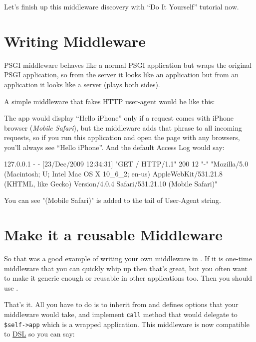 Let's finish up this middleware discovery with ``Do It Yourself''
tutorial now.

\section{Writing Middleware}\label{writing-middleware}

PSGI middleware behaves like a normal PSGI application but wraps the
original PSGI application, so from the server it looks like an
application but from an application it looks like a server (plays both
sides).

A simple middleware that fakes HTTP user-agent would be like this:


The app would display ``Hello iPhone'' only if a request comes with
iPhone browser (\emph{Mobile Safari}), but the middleware adds that
phrase to all incoming requests, so if you run this application and open
the page with any browsers, you'll always see ``Hello iPhone''. And the
default Access Log would say:

\begin{shell}
127.0.0.1 - - [23/Dec/2009 12:34:31] "GET / HTTP/1.1" 200 12 "-" "Mozilla/5.0 
(Macintosh; U; Intel Mac OS X 10_6_2; en-us) AppleWebKit/531.21.8 (KHTML, like
Gecko) Version/4.0.4 Safari/531.21.10 (Mobile Safari)"
\end{shell}

You can see "(Mobile Safari)" is added to the tail of User-Agent
string.

\section{Make it a reusable
Middleware}\label{make-it-a-reusable-middleware}

So that was a good example of writing your own middleware in
. If it is one-time middleware that you can quickly
whip up then that's great, but you often want to make it generic enough
or reusable in other applications too. Then you should use
.


That's it. All you have to do is to inherit from  and
defines options that your middleware would take, and implement
\lstinline!call! method that would delegate to \lstinline!$self->app!
which is a wrapped application. This middleware is now compatible to
\href{http://advent.plackperl.org/2009/12/day-11-using-plackbuilder.html}{
DSL} so you can say:

